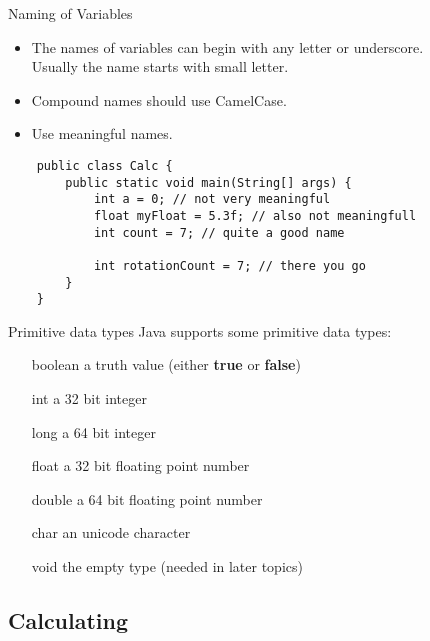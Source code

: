 \begin{frame}[fragile]{Naming of Variables}
	\begin{itemize}
		\item The names of variables can begin with any letter or underscore. \\
		Usually the name starts with small letter.
		\item Compound names should use CamelCase.
		\item Use meaningful names.
	\end{itemize}
	\begin{lstlisting}
	public class Calc {
	    public static void main(String[] args) {
	    	int a = 0; // not very meaningful
	    	float myFloat = 5.3f; // also not meaningfull
	    	int count = 7; // quite a good name

	    	int rotationCount = 7; // there you go
	    }
	}
	\end{lstlisting}
\end{frame}

\begin{frame}{Primitive data types}
	Java supports some primitive data types:
	\begin{itemize}
		\item[boolean] a truth value (either \textbf{true} or \textbf{false})
		\item[int] a 32 bit integer
		\item[long] a 64 bit integer
		\item[float] a 32 bit floating point number
		\item[double] a 64 bit floating point number
		\item[char] an unicode character
		\item[void] the empty type (needed in later topics)
	\end{itemize}
\end{frame}

\subsection{Calculating}

